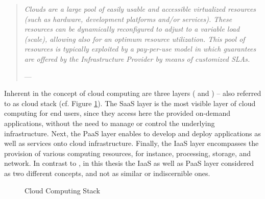 \begin{quotation}{\slshape 
Clouds are a large pool of easily usable and accessible virtualized resources (such as hardware, development platforms and/or services). These resources can be dynamically reconfigured to adjust to a variable load (scale), allowing also for an optimum resource utilization. This pool of resources is typically exploited by a pay-per-use model in which guarantees are offered by the Infrastructure Provider by means of customized \acp{SLA}.}
\vspace*{-7pt}
\begin{flushright}
	--- \citealp[p. 51]{Vaquero2009}
\end{flushright}
\end{quotation}

Inherent in the concept of cloud computing are three layers (\citealp[pp. 118-119]{Iyer2010} and \citealp[pp. 2-3]{Mell2011}) -- also referred to as cloud stack (cf. Figure \ref{fig:ccs}). The \ac{SaaS} layer is the most visible layer of cloud computing for end users, since they access here the provided on-demand applications, without the need to manage or control the underlying infrastructure. Next, the \ac{PaaS} layer enables to develop and deploy applications as well as services onto cloud infrastructure. Finally, the \ac{IaaS} layer encompasses the provision of various computing resources, for instance, processing, storage, and network. In contrast to \citet[p. 50]{Armbrust2010}, in this thesis the \ac{IaaS} as well as \ac{PaaS} layer considered as two different concepts, and not as similar or indiscernible ones. 

\begin{figure}[tb]
	\centering
	
	\caption{Cloud Computing Stack}
	\label{fig:ccs}
\end{figure}

